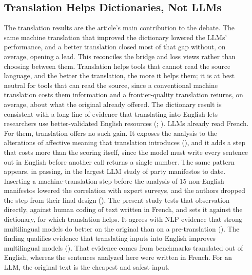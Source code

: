 \documentclass[
  man,
  floatsintext,
  longtable,
  nolmodern,
  notxfonts,
  notimes,
  colorlinks=true,linkcolor=blue,citecolor=blue,urlcolor=blue]{apa7}
\begin{document}
\subsection{Translation Helps Dictionaries, Not
LLMs}\label{translation-helps-dictionaries-not-llms}

The translation results are the article's main contribution to the
debate. The same machine translation that improved the dictionary
lowered the LLMs' performance, and a better translation closed most of
that gap without, on average, opening a lead. This reconciles the bridge
and loss views rather than choosing between them. Translation helps
tools that cannot read the source language, and the better the
translation, the more it helps them; it is at best neutral for tools
that can read the source, since a conventional machine translation costs
them information and a frontier-quality translation returns, on average,
about what the original already offered. The dictionary result is
consistent with a long line of evidence that translating into English
lets researchers use better-validated English resources
(;
). LLMs already read French. For them, translation offers no such
gain. It exposes the analysis to the alterations of affective meaning
that translation introduces
(), and it
adds a step that costs more than the scoring itself, since the model
must write every sentence out in English before another call returns a
single number. The same pattern appears, in passing, in the largest LLM
study of party manifestos to date. Inserting a machine-translation step
before the analysis of 15 non-English manifestos lowered the correlation
with expert surveys, and the authors dropped the step from their final
design (). The present study tests that observation directly, against human
coding of text written in French, and sets it against the dictionary,
for which translation helps. It agrees with NLP evidence that strong
multilingual models do better on the original than on a pre-translation
(). The finding qualifies evidence that translating inputs into
English improves multilingual models
(). That
evidence comes from benchmarks translated out of English, whereas the
sentences analyzed here were written in French. For an LLM, the original
text is the cheapest and safest input.
\end{document}
